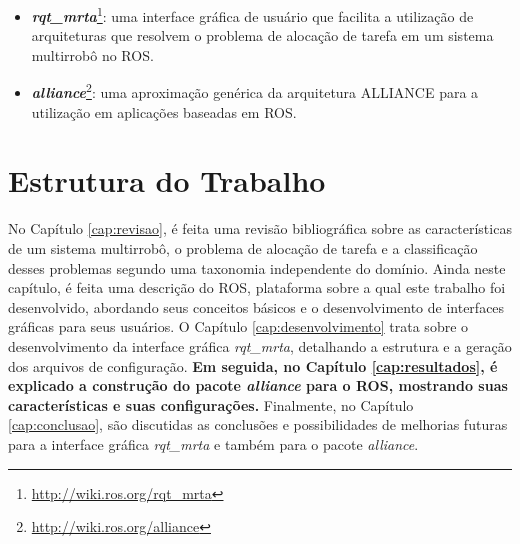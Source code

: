         \begin{itemize}
            \item \textbf{\textit{rqt\_mrta}}\footnote{\url{http://wiki.ros.org/rqt_mrta}}: uma interface gráfica de usuário que facilita a utilização de arquiteturas que resolvem o problema de alocação de tarefa em um sistema multirrobô no ROS.
            \item \textbf{\textit{alliance}}\footnote{\url{http://wiki.ros.org/alliance}}: uma aproximação genérica da arquitetura ALLIANCE para a utilização em aplicações baseadas em ROS.
        \end{itemize}
    
    \section{Estrutura do Trabalho} \label{sec:estrutura}
        No Capítulo \ref{cap:revisao}, é feita uma revisão bibliográfica sobre as características de um sistema multirrobô, o problema de alocação de tarefa e a classificação desses problemas segundo uma taxonomia independente do domínio. Ainda neste capítulo, é feita uma descrição do ROS, plataforma sobre a qual este trabalho foi desenvolvido, abordando seus conceitos básicos e o desenvolvimento de interfaces gráficas para seus usuários. O Capítulo \ref{cap:desenvolvimento} trata sobre o desenvolvimento da interface gráfica \textit{rqt\_mrta}, detalhando a estrutura e a geração dos arquivos de configuração. \textbf{\color{red}Em seguida, no Capítulo \ref{cap:resultados}, é explicado a construção do pacote \textit{alliance} para o ROS, mostrando suas características e suas configurações.} Finalmente, no Capítulo \ref{cap:conclusao}, são discutidas as conclusões e possibilidades de melhorias futuras para a interface gráfica \textit{rqt\_mrta} e também para o pacote \textit{alliance}. %